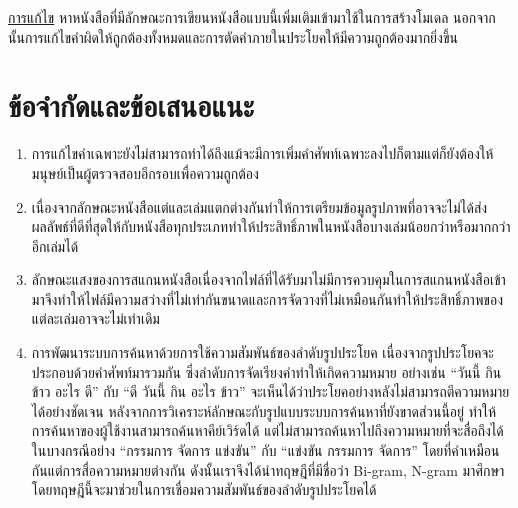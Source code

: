 \underline{การแก้ไข}	
หาหนังสือที่มีลักษณะการเขียนหนังสือแบบนี้เพิ่มเติมเข้ามาใช้ในการสร้างโมเดล นอกจากนั้นการแก้ไขคำผิดให้ถูกต้องทั้งหมดและการตัดคำภายในประโยคให้มีความถูกต้องมากยิ่งขึ้น

\section{ข้อจำกัดและข้อเสนอแนะ}
\begin{enumerate}
    \item การแก้ไขคำเฉพาะยังไม่สามารถทำได้ถึงแม้จะมีการเพิ่มคำศัพท์เฉพาะลงไปก็ตามแต่ก็ยังต้องให้มนุษย์เป็นผู้ตรวจสอบอีกรอบเพื่อความถูกต้อง
    \item เนื่องจากลักษณะหนังสือแต่และเล่มแตกต่างกันทำให้การเตรียมข้อมูลรูปภาพที่อาจจะไม่ได้ส่งผลลัพธ์ที่ดีที่สุดให้กับหนังสือทุกประเภททำให้ประสิทธิ์ภาพในหนังสือบางเล่มน้อยกว่าหรือมากกว่าอีกเล่มได้
    \item ลักษณะแสงของการสแกนหนังสือเนื่องจากไฟล์ที่ได้รับมาไม่มีการควบคุมในการสแกนหนังสือเข้ามาจึงทำให้ไฟล์มีความสว่างที่ไม่เท่ากันขนาดและการจัดวางที่ไม่เหมือนกันทำให้ประสิทธิ์ภาพของแต่ละเล่มอาจจะไม่เท่าเดิม
    \item การพัฒนาระบบการค้นหาด้วยการใช้ความสัมพันธ์ของลำดับรูปประโยค เนื่องจากรูปประโยคจะประกอบด้วยคำศัพท์มารวมกัน ซึ่งลำดับการจัดเรียงคำทำให้เกิดความหมาย อย่างเช่น “วันนี้ กิน ข้าว อะไร ดี” กับ “ดี วันนี้ กิน อะไร ข้าว” จะเห็นได้ว่าประโยคอย่างหลังไม่สามารถตีความหมายได้อย่างชัดเจน หลังจากการวิเคราะห์ลักษณะกับรูปแบบระบบการค้นหาที่ยังขาดส่วนนี้อยู่ ทำให้การค้นหาของผู้ใช้งานสามารถค้นหาคีย์เวิร์ดได้ แต่ไม่สามารถค้นหาไปถึงความหมายที่จะสื่อถึงได้ในบางกรณีอย่าง “กรรมการ จัดการ แข่งขัน” กับ “แข่งขัน กรรมการ จัดการ” โดยที่คำเหมือนกันแต่การสื่อความหมายต่างกัน ดังนั้นเราจึงได้นำทฤษฎีที่มีชื่อว่า Bi-gram, N-gram มาศึกษาโดยทฤษฎีนี้จะมาช่วยในการเชื่อมความสัมพันธ์ของลำดับรูปประโยคได้
\end{enumerate}
